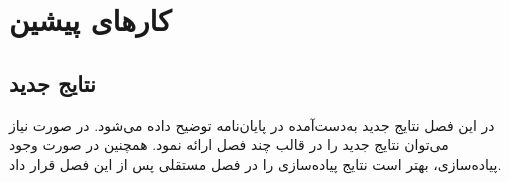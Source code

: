 \chapter{کارهای پیشین}
\section{نتایج جدید}

در این فصل نتایج جدید به‌دست‌آمده در پایان‌نامه توضیح داده می‌شود.
در صورت نیاز می‌توان نتایج جدید را در قالب چند فصل ارائه نمود.
همچنین در صورت وجود پیاده‌سازی، بهتر است نتایج پیاده‌سازی را
در فصل مستقلی پس از این فصل قرار داد.
